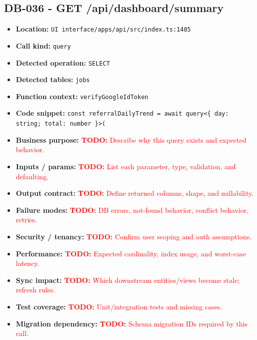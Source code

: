 \documentclass[11pt]{article}
\newcommand{\todoitem}[1]{\textcolor{red}{\textbf{TODO:} #1}}
\begin{document}
\subsection{DB-036 - GET /api/dashboard/summary}
\begin{itemize}[leftmargin=1.5em]
\item \textbf{Location:} \texttt{UI interface/apps/api/src/index.ts:1485}
\item \textbf{Call kind:} \texttt{query}
\item \textbf{Detected operation:} \texttt{SELECT}
\item \textbf{Detected tables:} \texttt{jobs}
\item \textbf{Function context:} \texttt{verifyGoogleIdToken}
\item \textbf{Code snippet:} \texttt{const referralDailyTrend = await query<\{ day: string; total: number \}>(}
\item \textbf{Business purpose:} \todoitem{Describe why this query exists and expected behavior.}
\item \textbf{Inputs / params:} \todoitem{List each parameter, type, validation, and defaulting.}
\item \textbf{Output contract:} \todoitem{Define returned columns, shape, and nullability.}
\item \textbf{Failure modes:} \todoitem{DB errors, not-found behavior, conflict behavior, retries.}
\item \textbf{Security / tenancy:} \todoitem{Confirm user scoping and auth assumptions.}
\item \textbf{Performance:} \todoitem{Expected cardinality, index usage, and worst-case latency.}
\item \textbf{Sync impact:} \todoitem{Which downstream entities/views become stale; refresh rules.}
\item \textbf{Test coverage:} \todoitem{Unit/integration tests and missing cases.}
\item \textbf{Migration dependency:} \todoitem{Schema migration IDs required by this call.}
\end{itemize}
\end{document}
